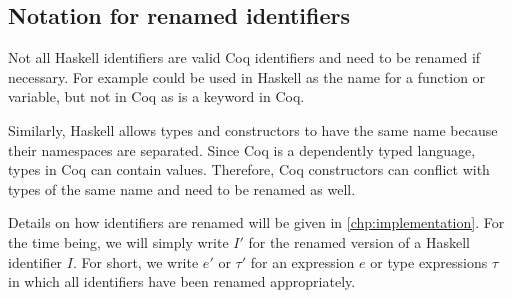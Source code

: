 \subsection{Notation for renamed identifiers} \label{sec:preliminaries:notation:renaming}
Not all Haskell identifiers are valid Coq identifiers and need to be renamed if necessary.
For example  could be used in Haskell as the name for a function or variable, but not in Coq as  is a keyword in Coq.

Similarly, Haskell allows types and constructors to have the same name because their namespaces are separated.
Since Coq is a dependently typed language, types in Coq can contain values.
Therefore, Coq constructors can conflict with types of the same name and need to be renamed as well.

Details on how identifiers are renamed will be given in \autoref{chp:implementation}.
For the time being, we will simply write $I'$ for the renamed version of a Haskell identifier $I$.
For short, we write $e'$ or $\tau'$ for an expression $e$ or type expressions $\tau$ in which all identifiers have been renamed appropriately.

